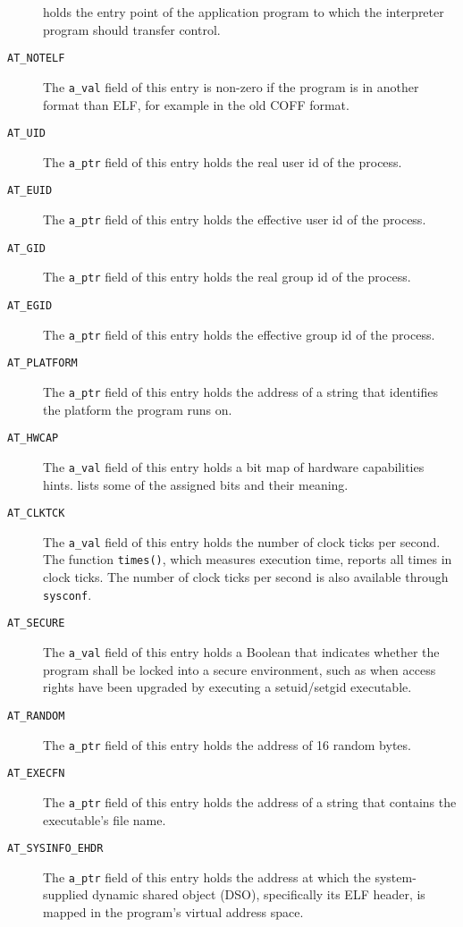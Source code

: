 \documentclass[english,11pt,twoside,toc=bib,toc=idx]{scrreprt}
\begin{document}
\begin{description}
  holds the entry point of the application program to which the
  interpreter program should transfer control.
\item[\texttt{AT\_NOTELF}] The \texttt{a\_val} field of this entry is
  non-zero if the program is in another format than ELF, for example
  in the old COFF format.
\item[\texttt{AT\_UID}] The \texttt{a\_ptr} field of this entry holds
  the real user id of the process.
\item[\texttt{AT\_EUID}] The \texttt{a\_ptr} field of this entry holds
  the effective user id of the process.
\item[\texttt{AT\_GID}] The \texttt{a\_ptr} field of this entry holds
  the real group id of the process.
\item[\texttt{AT\_EGID}] The \texttt{a\_ptr} field of this entry holds
  the effective group id of the process.
\item[\texttt{AT\_PLATFORM}] The \texttt{a\_ptr} field of this entry holds
  the address of a string that identifies the platform the program runs
  on.
\item[\texttt{AT\_HWCAP}] The \texttt{a\_val} field of this entry holds a
  bit map of hardware capabilities hints.
   lists some of the assigned bits and their meaning.
\item[\texttt{AT\_CLKTCK}] The \texttt{a\_val} field of this entry holds
  the number of clock ticks per second.  The function \texttt{times()},
  which measures execution time, reports all times in clock ticks.  The
  number of clock ticks per second is also available through
  \texttt{sysconf}.
\item[\texttt{AT\_SECURE}] The \texttt{a\_val} field of this entry holds a
  Boolean that indicates whether the program shall be locked into a secure
  environment, such as when access rights have been upgraded by executing
  a setuid/setgid executable.
\item[\texttt{AT\_RANDOM}] The \texttt{a\_ptr} field of this entry holds
  the address of 16 random bytes.
\item[\texttt{AT\_EXECFN}] The \texttt{a\_ptr} field of this entry holds
  the address of a string that contains the executable's file name.
\item[\texttt{AT\_SYSINFO\_EHDR}] The \texttt{a\_ptr} field of this entry
  holds the address at which the system-supplied dynamic shared object
  (DSO), specifically its ELF header, is mapped in the program's virtual
  address space.
\end{description}
\end{document}
